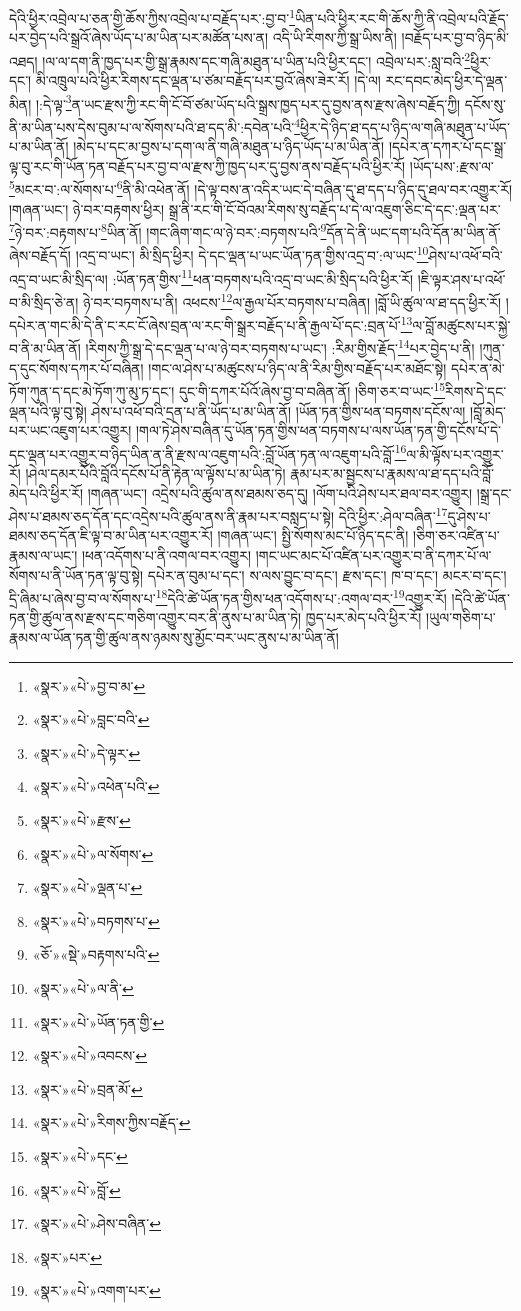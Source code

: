 དེའི་ཕྱིར་འབྲེལ་པ་ཅན་གྱི་ཆོས་ཀྱིས་འབྲེལ་པ་བརྗོད་པར་:བྱ་བ་\footnote{«སྣར་»«པེ་»བྱ་བ་མ་}ཡིན་པའི་ཕྱིར་རང་གི་ཆོས་ཀྱི་ནི་འབྲེལ་པའི་རྗོད་པར་བྱེད་པའི་སྒྲའོ་ཞེས་ཡོད་པ་མ་ཡིན་པར་མཚོན་པས་ན། འདི་ཡི་རིགས་ཀྱི་སྒྲ་ཡིས་ནི། །བརྗོད་པར་བྱ་བ་ཉིད་མི་འཐད། །ལ་ལ་དག་ནི་ཁྱད་པར་གྱི་སྒྲ་རྣམས་དང་གཞི་མཐུན་པ་ཡིན་པའི་ཕྱིར་དང་། འབྲེལ་པར་:སླ་བའི་\footnote{«སྣར་»«པེ་»བླང་བའི་}ཕྱིར་དང་། མི་འཁྲུལ་པའི་ཕྱིར་རིགས་དང་ལྡན་པ་ཙམ་བརྗོད་པར་བྱའོ་ཞེས་ཟེར་རོ། །དེ་ལ། རང་དབང་མེད་ཕྱིར་དེ་ལྡན་མིན། །:དེ་ལྟ་\footnote{«སྣར་»«པེ་»དེ་ལྟར་}ན་ཡང་རྫས་ཀྱི་རང་གི་ངོ་བོ་ཙམ་ཡོད་པའི་སྒྲས་ཁྱད་པར་དུ་བྱས་ནས་རྫས་ཞེས་བརྗོད་ཀྱི། དངོས་སུ་ནི་མ་ཡིན་པས་དེས་བུམ་པ་ལ་སོགས་པའི་ཐ་དད་མི་:དབེན་པའི་\footnote{«སྣར་»«པེ་»འཕེན་པའི་}ཕྱིར་དེ་ཉིད་ཐ་དད་པ་ཉིད་ལ་གཞི་མཐུན་པ་ཡོད་པ་མ་ཡིན་ནོ། །མེད་པ་དང་མ་བྱས་པ་དག་ལ་ནི་གཞི་མཐུན་པ་ཉིད་ཡོད་པ་མ་ཡིན་ནོ། །དཔེར་ན་དཀར་པོ་དང་སྒྲ་ལྟ་བུ་རང་གི་ཡོན་ཏན་བརྗོད་པར་བྱ་བ་ལ་རྫས་ཀྱི་ཁྱད་པར་དུ་བྱས་ནས་བརྗོད་པའི་ཕྱིར་རོ། །ཡོད་པས་:རྫས་ལ་\footnote{«སྣར་»«པེ་»རྫས་}མངར་བ་:ལ་སོགས་པ་\footnote{«སྣར་»«པེ་»ལ་སོགས་}ནི་མི་འཕེན་ནོ། །དེ་ལྟ་བས་ན་འདིར་ཡང་དེ་བཞིན་དུ་ཐ་དད་པ་ཉིད་དུ་ཐལ་བར་འགྱུར་རོ། །གཞན་ཡང་། ཉེ་བར་བརྟགས་ཕྱིར། སྒྲ་ནི་རང་གི་ངོ་བོའམ་རིགས་སུ་བརྗོད་པ་དེ་ལ་འཇུག་ཅིང་དེ་དང་:ལྡན་པར་\footnote{«སྣར་»«པེ་»ལྡན་པ་}ཉེ་བར་:བརྟགས་པ་\footnote{«སྣར་»«པེ་»བཏགས་པ་}ཡིན་ནོ། །གང་ཞིག་གང་ལ་ཉེ་བར་:བཏགས་པའི་\footnote{«ཅོ་»«སྡེ་»བརྟགས་པའི་}དོན་དེ་ནི་ཡང་དག་པའི་དོན་མ་ཡིན་ནོ་ཞེས་བརྗོད་དོ། །འདྲ་བ་ཡང་། མི་སྲིད་ཕྱིར། དེ་དང་ལྡན་པ་ཡང་ཡོན་ཏན་གྱིས་འདྲ་བ་:ལ་ཡང་\footnote{«སྣར་»«པེ་»ལ་ནི་}ཤེས་པ་འཕོ་བའི་འདྲ་བ་ཡང་མི་སྲིད་ལ། :ཡོན་ཏན་གྱིས་\footnote{«སྣར་»«པེ་»ཡོན་ཏན་གྱི་}ཕན་བཏགས་པའི་འདྲ་བ་ཡང་མི་སྲིད་པའི་ཕྱིར་རོ། །ཇི་ལྟར་ཤས་པ་འཕོ་བ་མི་སྲིད་ཅེ་ན། ཉེ་བར་བཏགས་པ་ནི། འཕངས་\footnote{«སྣར་»«པེ་»འབངས་}ལ་རྒྱལ་པོར་བཏགས་པ་བཞིན། །བློ་ཡི་ཚུལ་ལ་ཐ་དད་ཕྱིར་རོ། །དཔེར་ན་གང་མི་དེ་ནི་ང་རང་ངོ་ཞེས་བྲན་ལ་རང་གི་སྒྲར་བརྗོད་པ་ནི་རྒྱལ་པོ་དང་:བྲན་པོ་\footnote{«སྣར་»«པེ་»བྲན་མོ་}ལ་བློ་མཚུངས་པར་སྐྱེ་བ་ནི་མ་ཡིན་ནོ། །རིགས་ཀྱི་སྒྲ་དེ་དང་ལྡན་པ་ལ་ཉེ་བར་བཏགས་པ་ཡང་། :རིམ་གྱིས་རྗོད་\footnote{«སྣར་»«པེ་»རིགས་ཀྱིས་བརྗོད་}པར་བྱེད་པ་ནི། །ཀུན་ད་དུང་སོགས་དཀར་པོ་བཞིན། །གང་ལ་ཤེས་པ་མཚུངས་པ་ཉིད་ལ་ནི་རིམ་གྱིས་བརྗོད་པར་མཐོང་སྟེ། དཔེར་ན་མེ་ཏོག་ཀུན་ད་དང་མེ་ཏོག་ཀུ་མུ་ཏ་དང་། དུང་གི་དཀར་པོའོ་ཞེས་བྱ་བ་བཞིན་ནོ། །ཅིག་ཅར་བ་ཡང་\footnote{«སྣར་»«པེ་»དང་}རིགས་དེ་དང་ལྡན་པའི་ལྟ་བུ་སྟེ། ཤེས་པ་འཕོ་བའི་དྲན་པ་ནི་ཡོད་པ་མ་ཡིན་ནོ། །ཡོན་ཏན་གྱིས་ཕན་བཏགས་དངོས་ལ། །བློ་མེད་པར་ཡང་འཇུག་པར་འགྱུར། །གལ་ཏེ་ཤེས་བཞིན་དུ་ཡོན་ཏན་གྱིས་ཕན་བཏགས་པ་ལས་ཡོན་ཏན་གྱི་དངོས་པོ་དེ་དང་ལྡན་པར་འགྱུར་བ་ཉིད་ཡིན་ན་ནི་རྫས་ལ་འཇུག་པའི་:བློ་ཡོན་ཏན་ལ་འཇུག་པའི་བློ་\footnote{«སྣར་»«པེ་»བློ་}ལ་མི་ལྟོས་པར་འགྱུར་རོ། །ཤེལ་དམར་པོའི་བློའི་དངོས་པོ་ནི་རྟེན་ལ་ལྟོས་པ་མ་ཡིན་ཏེ། རྣམ་པར་མ་སྦྱངས་པ་རྣམས་ལ་ཐ་དད་པའི་བློ་མེད་པའི་ཕྱིར་རོ། །གཞན་ཡང་། འདྲེས་པའི་ཚུལ་ནས་ཐམས་ཅད་དུ། །ལོག་པའི་ཤེས་པར་ཐལ་བར་འགྱུར། །སྒྲ་དང་ཤེས་པ་ཐམས་ཅད་དོན་དང་འདྲེས་པའི་ཚུལ་ནས་ནི་རྣམ་པར་བསླད་པ་སྟེ། དེའི་ཕྱིར་:ཤེལ་བཞིན་\footnote{«སྣར་»«པེ་»ཤེས་བཞིན་}དུ་ཤེས་པ་ཐམས་ཅད་དོན་ཇི་ལྟ་བ་མ་ཡིན་པར་འགྱུར་རོ། །གཞན་ཡང་། སྤྱི་སོགས་མང་པོ་ཉིད་དང་ནི། །ཅིག་ཅར་འཛིན་པ་རྣམས་ལ་ཡང་། །ཕན་འདོགས་པ་ནི་འགལ་བར་འགྱུར། །གང་ཡང་མང་པོ་འཛིན་པར་འགྱུར་བ་ནི་དཀར་པོ་ལ་སོགས་པ་ནི་ཡོན་ཏན་ལྟ་བུ་སྟེ། དཔེར་ན་བུམ་པ་དང་། ས་ལས་བྱུང་བ་དང་། རྫས་དང་། ཁ་བ་དང་། མངར་བ་དང་། དྲི་ཞིམ་པ་ཞེས་བྱ་བ་ལ་སོགས་པ་\footnote{«སྣར་»པར་}དེའི་ཚེ་ཡོན་ཏན་གྱིས་ཕན་འདོགས་པ་:འགལ་བར་\footnote{«སྣར་»«པེ་»འགག་པར་}འགྱུར་རོ། །དེའི་ཚེ་ཡོན་ཏན་གྱི་ཚུལ་ནས་རྫས་དང་གཅིག་འགྱུར་བར་ནི་ནུས་པ་མ་ཡིན་ཏེ། ཁྱད་པར་མེད་པའི་ཕྱིར་རོ། །ཡུལ་གཅིག་པ་རྣམས་ལ་ཡོན་ཏན་གྱི་ཚུལ་ནས་ཉམས་སུ་མྱོང་བར་ཡང་ནུས་པ་མ་ཡིན་ནོ། 